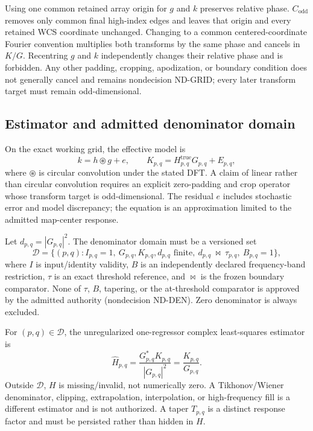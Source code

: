 \documentclass[11pt]{article}
\begin{document}
Using one common retained array origin for $g$ and $k$ preserves relative
phase.  $C_{\mathrm{odd}}$ removes only common final high-index edges and leaves
that origin and every retained WCS coordinate unchanged.  Changing to a common
centered-coordinate Fourier convention multiplies both transforms by the same
phase and cancels in $K/G$.  Recentring $g$ and $k$ independently changes their
relative phase and is forbidden.  Any other padding, cropping, apodization, or
boundary condition does not generally cancel and remains nondecision ND-GRID;
every later transform target must remain odd-dimensional.

\subsection{Estimator and admitted denominator domain}

On the exact working grid, the effective model is
\[
 k=h\circledast g+e,
 \qquad K_{p,q}=H^{\mathrm{true}}_{p,q}G_{p,q}+E_{p,q},
\]
where $\circledast$ is circular convolution under the stated DFT.  A claim of
linear rather than circular convolution requires an explicit zero-padding and
crop operator whose transform target is odd-dimensional.  The residual $e$
includes stochastic error and model
discrepancy; the equation is an approximation limited to the admitted
map-center response.

Let $d_{p,q}=|G_{p,q}|^2$.  The denominator domain must be a versioned set
\[
 \mathcal D=\{(p,q): I_{p,q}=1,\ G_{p,q},K_{p,q},d_{p,q}\text{ finite},
 \ d_{p,q}\ \bowtie\ \tau_{p,q},\ B_{p,q}=1\},
\]
where $I$ is input/identity validity, $B$ is an independently declared
frequency-band restriction, $\tau$ is an exact threshold reference, and
$\bowtie$ is the frozen boundary comparator.  None of $\tau$, $B$, tapering,
or the at-threshold comparator is approved by the admitted authority
(nondecision ND-DEN).  Zero denominator is always excluded.

For $(p,q)\in\mathcal D$, the unregularized one-regressor complex
least-squares estimator is
\begin{equation}
 \widehat H_{p,q}
 =\frac{G_{p,q}^{*}K_{p,q}}{|G_{p,q}|^2}
 =\frac{K_{p,q}}{G_{p,q}}.
 \label{eq:estimator}
\end{equation}
Outside $\mathcal D$, $H$ is missing/invalid, not numerically zero.  A
Tikhonov/Wiener denominator, clipping, extrapolation, interpolation, or
high-frequency fill is a different estimator and is not authorized.  A taper
$T_{p,q}$ is a distinct response factor and must be persisted rather than
hidden in $H$.
\end{document}
